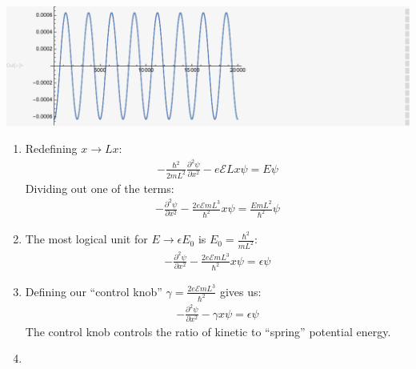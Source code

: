 \documentclass[12pt]{article}
\newcommand{\p}[2]{\frac{\partial #1}{\partial #2}}
\begin{document}
\begin{enumerate}
\begin{enumerate}
      \includegraphics{HW_6_screenshots/q_5_gr6}

    \end{enumerate}
    \begin{enumerate}
      \item Redefining $x\rightarrow Lx$:
      \begin{gather}
        -\frac{\hbar^2}{2mL^2}\p{^2\psi}{x^2}-e\mathcal{E}Lx\psi=E\psi
      \end{gather}
      Dividing out one of the terms:
      \begin{gather}
        -\p{^2\psi}{x^2}-\frac{2e\mathcal{E}mL^3}{\hbar^2}x\psi=\frac{EmL^2}{\hbar^2}\psi
      \end{gather}
      \item The most logical unit for $E\rightarrow\epsilon E_0$ is $E_0=\frac{\hbar^2}{mL^2}$:
      \begin{gather*}
        -\p{^2\psi}{x^2}-\frac{2e\mathcal{E}mL^3}{\hbar^2}x\psi=\epsilon\psi
      \end{gather*}
      \item Defining our \enquote{control knob} $\gamma=\frac{2e\mathcal{E}mL^3}{\hbar^2}$ gives us:
      \begin{gather*}
        -\p{^2\psi}{x^2}-\gamma x\psi=\epsilon\psi
      \end{gather*}
      The control knob controls the ratio of kinetic to \enquote{spring} potential energy.
      \item\\


\end{enumerate}
\end{enumerate}
\end{document}
